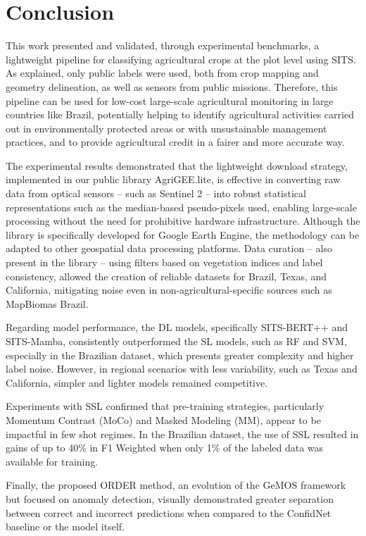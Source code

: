\chapter{Conclusion}
\label{chapter:conclusion}

This work presented and validated, through experimental benchmarks, a lightweight pipeline for classifying agricultural crops at the plot level using SITS. As explained, only public labels were used, both from crop mapping and geometry delineation, as well as sensors from public missions. Therefore, this pipeline can be used for low-cost large-scale agricultural monitoring in large countries like Brazil, potentially helping to identify agricultural activities carried out in environmentally protected areas or with unsustainable management practices, and to provide agricultural credit in a fairer and more accurate way.

The experimental results demonstrated that the lightweight download strategy, implemented in our public library AgriGEE.lite, is effective in converting raw data from optical sensors -- such as Sentinel 2 -- into robust statistical representations such as the median-based pseudo-pixels used, enabling large-scale processing without the need for prohibitive hardware infrastructure. Although the library is specifically developed for Google Earth Engine, the methodology can be adapted to other geospatial data processing platforms. Data curation -- also present in the library -- using filters based on vegetation indices and label consistency, allowed the creation of reliable datasets for Brazil, Texas, and California, mitigating noise even in non-agricultural-specific sources such as MapBiomas Brazil.

Regarding model performance, the DL models, specifically SITS-BERT++ and SITS-Mamba, consistently outperformed the SL models, such as RF and SVM, especially in the Brazilian dataset, which presents greater complexity and higher label noise. However, in regional scenarios with less variability, such as Texas and California, simpler and lighter models remained competitive.

Experiments with SSL confirmed that pre-training strategies, particularly Momentum Contrast (MoCo) and Masked Modeling (MM), appear to be impactful in few shot regimes. In the Brazilian dataset, the use of SSL resulted in gains of up to 40\% in F1 Weighted when only 1\% of the labeled data was available for training.

Finally, the proposed \ac{ORDER} method, an evolution of the GeMOS framework but focused on anomaly detection, visually demonstrated greater separation between correct and incorrect predictions when compared to the ConfidNet baseline or the model itself. 

